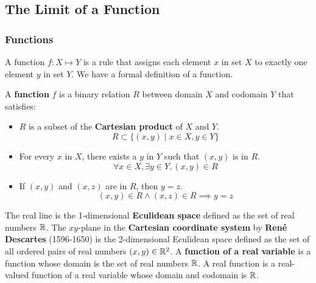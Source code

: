 \subsection{The Limit of a Function}

\subsubsection{Functions}
A function \(f:X\mapsto Y\) is a rule that assigns each element \(x\) in set
\(X\) to exactly one element \(y\) in set \(Y\).
We have a formal definition of a function.
\begin{definition}
    A \textbf{function} \(f\) is a binary relation \(R\) between domain \(X\)
    and codomain \(Y\) that satisfies:
    \begin{itemize}
        \item \(R\) is a subset of the \textbf{Cartesian product} of \(X\) and \(Y\).
        \[R\subset\{(x,y)\mid x\in X,y\in Y\}\]
        \item For every \(x\) in \(X\), there exists a \(y\) in \(Y\) such
        that \((x,y)\) is in \(R\).
        \[\forall x\in X,\exists y\in Y,(x,y)\in R\]
        \item If \((x,y)\) and \((x,z)\) are in \(R\), then \(y=z\).
        \[(x,y)\in R \wedge (x,z)\in R \implies y=z\]
    \end{itemize}
\end{definition}
The real line is the 1-dimensional \textbf{Eculidean space} defined as the set
of real numbers \(\mathbb{R}\).
The \(xy\)-plane in the \textbf{Cartesian coordinate system} by
\textbf{René Descartes} (1596-1650) is the 2-dimensional Eculidean space defined
as the set of all ordered pairs of real numbers \((x,y)\in\mathbb{R}^2\).
A \textbf{function of a real variable} is a function whose domain is the set
of real numbers \(\mathbb{R}\). A real function is a real-valued function of a real
variable whose domain and codomain is \(\mathbb{R}\).

